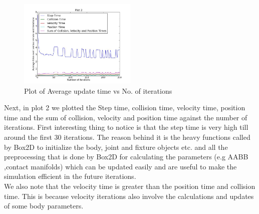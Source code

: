 \documentclass[10pt]{article} \usepackage[a4paper,left=0.8in,right=0.8in,top=0.4in,bottom=0.8in]{geometry} \usepackage{graphicx}
\begin{document}
\begin{figure}[ht!]
\centering
\includegraphics[width=0.5\textwidth]{images/plot2.jpg}
\caption{Plot of Average update time vs No. of iterations}
\end{figure}
Next, in plot 2 we plotted the Step time, collision time, velocity time, position time and the sum of collision, velocity and position time against the number of iterations. First interesting thing to notice is that the step time is very high till around the first 30 iterations. The reason behind it is the heavy functions called by Box2D to initialize the body, joint and fixture objects etc. and all the preprocessing that is done by Box2D for calculating the parameters (e.g AABB ,contact manifolds) which can be updated easily and are useful to make the simulation efficient in the future iterations.
\\
We also note that the velocity time is greater than the position time and collision time. This is because velocity iterations also involve the calculations and updates of some body parameters.
\end{document}
